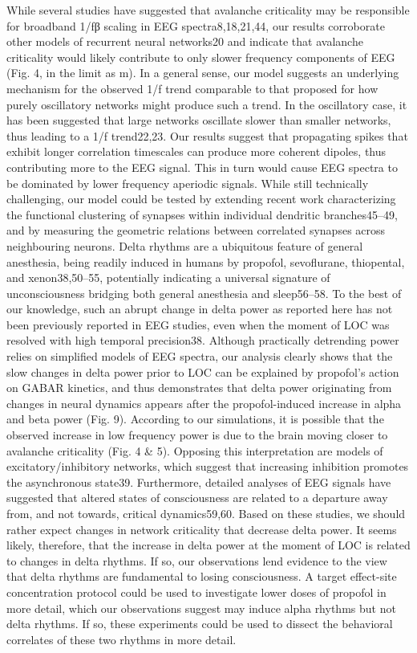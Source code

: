 While several studies have suggested that avalanche criticality may be responsible for broadband 1/fβ scaling in EEG spectra8,18,21,44, our results corroborate other models of recurrent neural networks20 and indicate that avalanche criticality would likely contribute to only slower frequency components of EEG (Fig. 4, in the limit as m). In a general sense, our model suggests an underlying mechanism for the observed 1/f trend comparable to that proposed for how purely oscillatory networks might produce such a trend. In the oscillatory case, it has been suggested that large networks oscillate slower than smaller networks, thus leading to a 1/f trend22,23. Our results suggest that propagating spikes that exhibit longer correlation timescales can produce more coherent dipoles, thus contributing more to the EEG signal. This in turn would cause EEG spectra to be dominated by lower frequency aperiodic signals. While still technically challenging, our model could be tested by extending recent work characterizing the functional clustering of synapses within individual dendritic branches45–49, and by measuring the geometric relations between correlated synapses across neighbouring neurons.
Delta rhythms are a ubiquitous feature of general anesthesia, being readily induced in humans by propofol, sevoflurane, thiopental, and xenon38,50–55, potentially indicating a universal signature of unconsciousness bridging both general anesthesia and sleep56–58. To the best of our knowledge, such an abrupt change in delta power as reported here has not been previously reported in EEG studies, even when the moment of LOC was resolved with high temporal precision38. Although practically detrending power relies on simplified models of EEG spectra, our analysis clearly shows that the slow changes in delta power prior to LOC can be explained by propofol’s action on GABAR kinetics, and thus demonstrates that delta power originating from changes in neural dynamics appears after the propofol-induced increase in alpha and beta power (Fig. 9). According to our simulations, it is possible that the observed increase in low frequency power is due to the brain moving closer to avalanche criticality (Fig. 4 & 5). Opposing this interpretation are models of excitatory/inhibitory networks, which suggest that increasing inhibition promotes the asynchronous state39. Furthermore, detailed analyses of EEG signals have suggested that altered states of consciousness are related to a departure away from, and not towards, critical dynamics59,60. Based on these studies, we should rather expect changes in network criticality that decrease delta power. It seems likely, therefore, that the increase in delta power at the moment of LOC is related to changes in delta rhythms. If so, our observations lend evidence to the view that delta rhythms are fundamental to losing consciousness. A target effect-site concentration protocol could be used to investigate lower doses of propofol in more detail, which our observations suggest may induce alpha rhythms but not delta rhythms. If so, these experiments could be used to dissect the behavioral correlates of these two rhythms in more detail.

